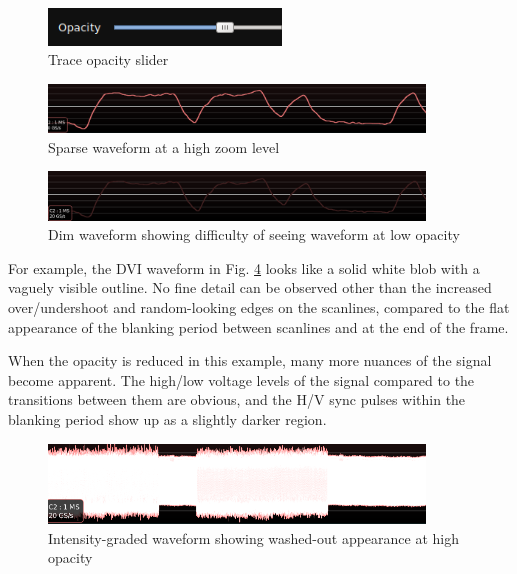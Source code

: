 \begin{figure}[H]
\centering
\includegraphics[height=1cm]{images/opacity-slider.png}
\caption{Trace opacity slider}
\label{opacityslider}
\end{figure}

\begin{figure}[H]
\centering
\includegraphics[width=10cm]{images/sparse-waveform.png}
\caption{Sparse waveform at a high zoom level}
\label{sparse-waveform}
\end{figure}

\begin{figure}[H]
\centering
\includegraphics[width=10cm]{images/dim-waveform.png}
\caption{Dim waveform showing difficulty of seeing waveform at low opacity}
\label{dim-waveform}
\end{figure}

For example, the DVI waveform in Fig. \ref{washedout-waveform} looks like a solid white blob with a vaguely visible
outline. No fine detail can be observed other than the increased over/undershoot and random-looking edges on the
scanlines, compared to the flat appearance of the blanking period between scanlines and at the end of the frame.

When the opacity is reduced in this example, many more nuances of the signal become apparent. The high/low voltage
levels of the signal compared to the transitions between them are obvious, and the H/V sync pulses within the blanking
period show up as a slightly darker region.

\begin{figure}[H]
\centering
\includegraphics[width=10cm]{images/washedout-waveform.png}
\caption{Intensity-graded waveform showing washed-out appearance at high opacity}
\label{washedout-waveform}
\end{figure}

